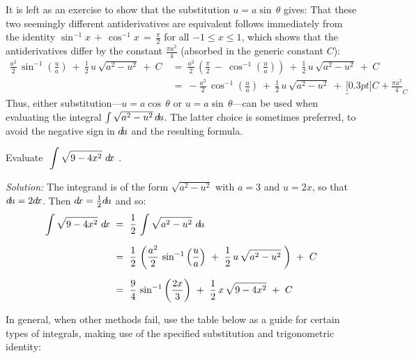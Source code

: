 It is left as an exercise to show that the substitution $u=a \sin\,\theta$ gives:
That these two seemingly different antiderivatives are equivalent follows
immediately from the identity $\sin^{-1} x \,+\, \cos^{-1} x \,=\, \frac{\pi}{2}$
for all $-1 \le x \le 1$, which shows that the antiderivatives differ by the
constant $\frac{\pi a^2}{4}$ (absorbed in the generic constant $C$):
\begin{align*}
\frac{a^2}{2}\,\sin^{-1} \left(\frac{u}{a}\right) ~+~
 \frac{1}{2}\,u\,\sqrt{a^2 - u^2} ~+~ C ~&=~
\frac{a^2}{2}\,\left(\frac{\pi}{2} ~-~ \cos^{-1} \left(\frac{u}{a}\right)\right) ~+~
 \frac{1}{2}\,u\,\sqrt{a^2 - u^2} ~+~ C\\[6pt]
&=~ -\frac{a^2}{2}\,\cos^{-1} \left(\frac{u}{a}\right) ~+~
 \frac{1}{2}\,u\,\sqrt{a^2 - u^2} ~+~ \underbracket[0.3pt]{C +\frac{\pi a^2}{4}}_{C}
\end{align*}
Thus, either substitution---$u=a \cos\,\theta$ or $u=a \sin\,\theta$---can be
used when evaluating the integral $\int \sqrt{a^2 - u^2}\,d\!u$. The latter
choice is sometimes preferred, to avoid the negative sign in $d\!u$ and the
resulting formula.
\newpage
\begin{exmp}\label{exmp:trigsub1}
\noindent Evaluate $~\displaystyle\int \sqrt{9-4x^2}~d\!x~$.\vspace{1mm}
\par\noindent\emph{Solution:} The integrand is of the form $\sqrt{a^2 - u^2}$
with $a=3$ and $u=2x$, so that $d\!u = 2d\!x$. Then $d\!x = \frac{1}{2}d\!u$ and so:
\begin{align*}
\int \sqrt{9-4x^2}~d\!x ~&=~ \frac{1}{2}\,\int \sqrt{a^2 - u^2}~d\!u\\[6pt]
&=~ \frac{1}{2}\,\left(\frac{a^2}{2}\,\sin^{-1} \left(\frac{u}{a}\right) ~+~
 \frac{1}{2}\,u\,\sqrt{a^2 - u^2}\;\right) ~+~ C\\[6pt]
&=~ \frac{9}{4}\,\sin^{-1} \left(\frac{2x}{3}\right) ~+~ \frac{1}{2}\,x\,\sqrt{9 - 4x^2} ~+~ C
\end{align*}
\end{exmp}
\divider
\vspace{2mm}
In general, when other methods fail, use the table below as a guide for certain
types of integrals, making use of the specified substitution and trigonometric
identity:

